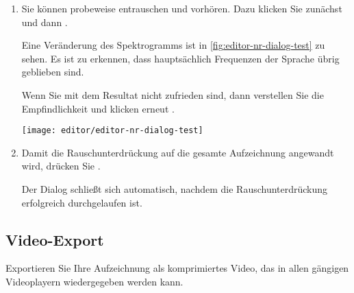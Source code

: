 \begin{enumerate}
	\item Sie können probeweise entrauschen und vorhören. Dazu klicken Sie zunächst  und dann \editorplay{}.
	
	Eine Veränderung des Spektrogramms ist in \autoref{fig:editor-nr-dialog-test} zu sehen. Es ist zu erkennen, dass hauptsächlich Frequenzen der Sprache übrig geblieben sind.
	
	Wenn Sie mit dem Resultat nicht zufrieden sind, dann verstellen Sie die Empfindlichkeit und klicken erneut .

	\begin{minipage}{0.9\textwidth}
		\centering
		\captionsetup{type=figure}
		\texttt{[image: editor/editor-nr-dialog-test]}
		\label{fig:editor-nr-dialog-test}
	\end{minipage}

	\item Damit die Rauschunterdrückung auf die gesamte Aufzeichnung angewandt wird, drücken Sie .
	
	Der Dialog schließt sich automatisch, nachdem die Rauschunterdrückung erfolgreich durchgelaufen ist.
\end{enumerate}


\subsection{Video-Export}
Exportieren Sie Ihre Aufzeichnung als komprimiertes Video, das in allen gängigen Videoplayern wiedergegeben werden kann.

